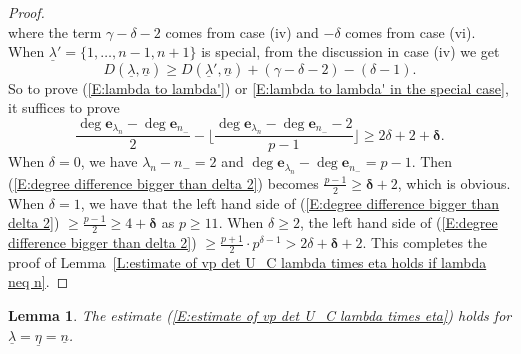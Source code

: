 \documentclass[12pt]{amsart}
\newtheorem{lemma}[subsection]{Lemma}
\theoremstyle{definition}
\numberwithin{equation}{subsection}
\def\bfe{\mathbf{e}}
\begin{document}
\begin{proof}
\begin{equation}
		\end{equation}
		where the term $\gamma-\delta-2$ comes from case (iv) and $-\delta$ comes from case (vi). When $\underline \lambda'=\{ 1,\dots, n-1,n+1\}$ is special, from the discussion in case (iv) we get 
        \[
        D(\underline \lambda,\underline n) \geq D(\underline \lambda', \underline n) + (\gamma-\delta-2) - (\delta-1).
        \]
        So to prove (\ref{E:lambda to lambda'}) or \eqref{E:lambda to lambda' in the special case}, it suffices to prove 
		\begin{equation}
			\label{E:degree difference bigger than delta 2} \frac {\deg \bfe_{\lambda_n} - \deg \bfe_{n_-}}2-\Big\lfloor\frac{\deg \bfe_{\lambda_n} - \deg \bfe_{n_-}-2}{p-1}\Big\rfloor \geq 2\delta+2+\boldsymbol{\delta}.
		\end{equation}
When $\delta=0$, we have $\lambda_n-n_-=2$ and $\deg \bfe_{\lambda_n}-\deg \bfe_{n_-}=p-1$. Then (\ref{E:degree difference bigger than delta 2}) becomes $\frac{p-1}2\geq \boldsymbol{\delta}+2$, which is obvious. When $\delta=1$, we have that the left hand side of (\ref{E:degree difference bigger than delta 2}) $\geq \frac{p-1}{2}\geq 4+\boldsymbol{\delta}$ as $p\geq 11$. When $\delta\geq 2$, the left hand side of (\ref{E:degree difference bigger than delta 2}) $\geq \frac{p+1}2\cdot p^{\delta-1}>2\delta+\boldsymbol{\delta}+2$. This completes the proof of Lemma~\ref{L:estimate of vp det U_C lambda times eta holds if lambda neq n}. 
\end{proof}


\begin{lemma}\label{L:estimate of vp det u_C lambda times eta holds for lambda=eta=n}
	The estimate (\ref{E:estimate of vp det U_C lambda times eta}) holds for $\underline \lambda=\underline \eta=\underline n$. 
\end{lemma}
\end{document}
